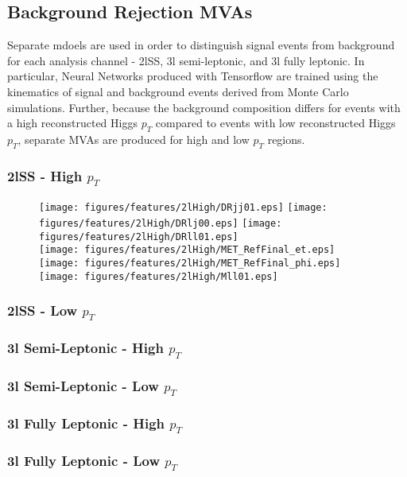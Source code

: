 \subsection{Background Rejection MVAs}
\label{subsec:bkgMVAs}

Separate mdoels are used in order to distinguish signal events from background for each analysis channel - 2lSS, 3l semi-leptonic, and 3l fully leptonic. In particular, Neural Networks produced with Tensorflow are trained using the kinematics of signal and background events derived from Monte Carlo simulations. Further, because the background composition differs for events with a high reconstructed Higgs $p_T$ compared to events with low reconstructed Higgs $p_T$, separate MVAs are produced for high and low $p_T$ regions. 


\subsubsection{2lSS - High $p_T$}
\label{sec:2lHigh}

\begin{figure}[!htbp]
\centering
\texttt{[image: figures/features/2lHigh/DRjj01.eps]}%
\texttt{[image: figures/features/2lHigh/DRlj00.eps]}%
\texttt{[image: figures/features/2lHigh/DRll01.eps]}\\
\texttt{[image: figures/features/2lHigh/MET\_RefFinal\_et.eps]}%
\texttt{[image: figures/features/2lHigh/MET\_RefFinal\_phi.eps]}%
\texttt{[image: figures/features/2lHigh/Mll01.eps]}\\
\caption{}
\label{fig:}
\end{figure}

\subsubsection{2lSS - Low $p_T$}
\label{sec:2lLow}

\subsubsection{3l Semi-Leptonic - High $p_T$}
\label{sec:3lSHigh}

\subsubsection{3l Semi-Leptonic - Low $p_T$}
\label{sec:3lSLow}

\subsubsection{3l Fully Leptonic - High $p_T$}
\label{sec:3lFHigh}

\subsubsection{3l Fully Leptonic - Low $p_T$}
\label{sec:3lFLow}
